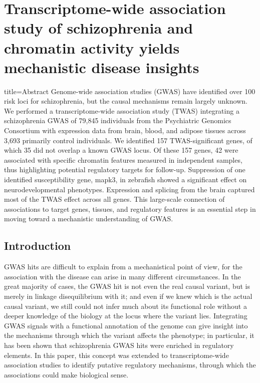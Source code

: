 \documentclass[../main.tex]{subfiles}
\begin{document}
\chapter[Transcriptome-wide association study of schizophrenia and 
chromatin activity]{Transcriptome-wide association study of 
	schizophrenia and chromatin activity yields mechanistic disease 
	insights}


\begin{external_abstract}{title=Abstract}
Genome-wide association studies (GWAS) have identified over 100 risk 
loci for schizophrenia, but the causal mechanisms remain largely 
unknown. We performed a transcriptome-wide association study (TWAS) 
integrating a schizophrenia GWAS of 79,845 individuals from the 
Psychiatric Genomics Consortium with expression data from brain, blood, 
and adipose tissues across 3,693 primarily control individuals. We 
identified 157 TWAS-significant genes, of which 35 did not overlap a 
known GWAS locus. Of these 157 genes, 42 were associated with specific 
chromatin features measured in independent samples, thus highlighting 
potential regulatory targets for follow-up. Suppression of one 
identified susceptibility gene, mapk3, in zebrafish showed a significant 
effect on neurodevelopmental phenotypes. Expression and splicing from 
the brain captured most of the TWAS effect across all genes. This 
large-scale connection of associations to target genes, tissues, and 
regulatory features is an essential step in moving toward a mechanistic 
understanding of GWAS.
\end{external_abstract}

\section{Introduction}

GWAS hits are difficult to explain from a mechanistical point of view, 
for the association with the disease can arise in many different 
circumstances. In the great majority of cases, the GWAS hit is not even 
the real causal variant, but is merely in linkage disequilibrium with 
it; and even if we knew which is the actual causal variant, we still 
could not infer much about its functional role without a deeper 
knowledge of the biology at the locus where the variant lies. 
Integrating GWAS signals with a functional annotation of the genome can 
give insight into the mechanisms through which the variant affects the 
phenotype; in particular, it has been shown that schizophrenia GWAS hits 
were enriched in regulatory elements. In this paper, this concept was 
extended to transcriptome-wide association studies to identify putative 
regulatory mechanisms, through which the associations could make 
biological sense.
\end{document}

